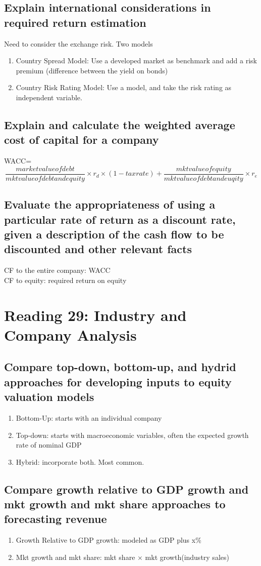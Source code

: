 \documentclass{article}
\newcommand{\be}{\begin{enumerate}}
\newcommand{\ee}{\end{enumerate}}
\begin{document}
\subsection{Explain international considerations in required return estimation}
Need to consider the exchange risk. Two models
\be
    \item Country Spread Model: Use a developed market as benchmark and add a risk premium
        (difference between the yield on bonds)
    \item Country Risk Rating Model: Use a model, and take the risk rating as 
        independent variable.
\ee
\subsection{Explain and calculate the weighted average cost of capital for a company}
WACC=
$$
    \frac{market value of debt}{mkt value of debt and equity}\times r_d \times(1-tax rate)
    +\frac{mkt value of equity}{mkt value of debt and euqity}\times r_e
$$
\subsection{Evaluate the appropriateness of using a particular rate of return as
a discount rate, given a description of the cash flow to be discounted and other
relevant facts}
CF to the entire company: WACC
\\CF to equity: required return on equity


\section{Reading 29: Industry and Company Analysis}
\subsection{Compare top-down, bottom-up, and hydrid approaches for developing
inputs to equity valuation models
}
\be
    \item Bottom-Up: starts with an individual company
    \item Top-down: starts with macroeconomic variables, often the expected growth rate of nominal
        GDP
    \item Hybrid: incorporate both. Most common.
\ee
\subsection{Compare growth relative to GDP growth and mkt growth and mkt share approaches
to forecasting revenue}
\be
    \item Growth Relative to GDP growth: modeled as GDP plus x\%
    \item Mkt growth and mkt share: mkt share $\times$ mkt growth(industry sales)
\ee
\end{document}
